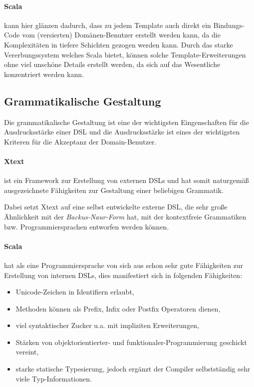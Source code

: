 \paragraph{Scala} kann hier glänzen dadurch, dass zu jedem Template auch
direkt ein Bindungs-Code vom (versierten) Domänen-Benutzer erstellt
werden kann, da die Komplexitäten in tiefere Schichten gezogen werden kann.
Durch das starke Vererbungssystem welches Scala bietet, können solche
Template-Erweiterungen ohne viel unschöne Details erstellt werden, da sich
auf das Wesentliche konzentriert werden kann.


\subsection{Grammatikalische Gestaltung}\label{sec-grammatikGestaltung}

Die grammatikalische Gestaltung ist eine der wichtigsten Eingenschaften
für die Ausdrucksstärke einer DSL und die Ausdrucksstärke ist eines
der wichtigsten Kriteren für die Akzeptanz der Domain-Benutzer.

\paragraph{Xtext} ist ein Framework zur Erstellung von externen DSLs und
hat somit naturgemäß ausgezeichnete Fähigkeiten zur Gestaltung einer beliebigen
Grammatik.

Dabei setzt Xtext auf eine selbst entwickelte externe DSL, die sehr große
Ähnlichkeit mit der \emph{Backus-Naur-Form} hat, mit der kontextfreie
Grammatiken bzw. Programmiersprachen entworfen werden können.

\paragraph{Scala} hat als eine Programmiersprache von sich aus schon
sehr gute Fähigkeiten zur Erstellung von internen DSLs, dies
manifestiert sich in folgenden Fähigkeiten:

\begin{itemize}
  \item Unicode-Zeichen in Identifiern erlaubt,
  \item Methoden können als Prefix, Infix oder Postfix Operatoren dienen,
  \item viel syntaktischer Zucker u.a. mit impliziten Erweiterungen,
  \item Stärken von objektorientierter- und funktionaler-Programmierung
        geschickt vereint,
  \item starke statische Typesierung, jedoch ergänzt der Compiler selbstständig
        sehr viele Typ-Informationen.
\end{itemize}

